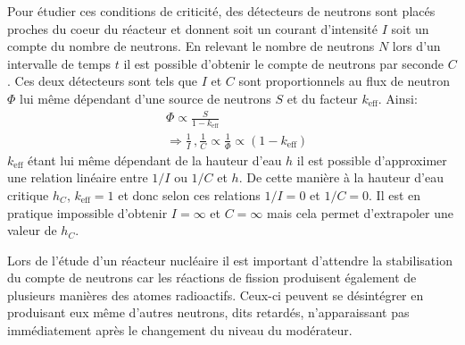Pour étudier ces conditions de criticité, des détecteurs de neutrons sont placés proches du coeur du réacteur et donnent soit un courant d'intensité $I$ soit un compte du nombre de neutrons. En relevant le nombre de neutrons $N$ lors d'un intervalle de temps $t$ il est possible d'obtenir le compte de neutrons par seconde $C$. Ces deux détecteurs sont tels que $I$ et $C$ sont proportionnels au flux de neutron $\Phi$ lui même dépendant d'une source de neutrons $S$ et du facteur $k_\mathrm{eff}$. Ainsi:
\begin{equation}
    \begin{aligned}
        & \Phi \propto \frac{S}{1 - k_\mathrm{eff}} \\
        & \Rightarrow \frac{1}{I} \, , \frac{1}{C} \propto \frac{1}{\Phi} \propto (1 - k_\mathrm{eff})
    \end{aligned}
    \label{eq:proportionalities}
\end{equation}
$k_\mathrm{eff}$ étant lui même dépendant de la hauteur d'eau $h$ il est possible d'approximer une relation linéaire entre $1/I$ ou $1/C$ et $h$. De cette manière à la hauteur d'eau critique $h_C$, $k_\mathrm{eff}=1$ et donc selon ces relations $1/I = 0$ et $1/C = 0$. Il est en pratique impossible d'obtenir $I = \infty$ et $C = \infty$ mais cela permet d'extrapoler une valeur de $h_C$.

Lors de l'étude d'un réacteur nucléaire il est important d'attendre la stabilisation du compte de neutrons car les réactions de fission produisent également de plusieurs manières des atomes radioactifs. Ceux-ci peuvent se désintégrer en produisant eux même d'autres neutrons, dits retardés, n'apparaissant pas immédiatement après le changement du niveau du modérateur.